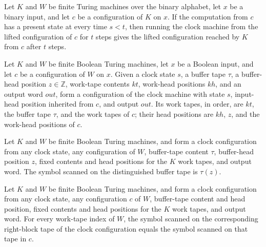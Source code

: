 \begin{lemma}
\label{Complexity.TimeHierarchy.kCfg_run}
\leanok
{}
Let $K$ and $W$ be finite Turing machines over the binary alphabet, let $x$ be a binary
input, and let $c$ be a configuration of $K$ on $x$. If the computation from $c$ has a
present state at every time $s<t$, then running the clock machine from the lifted
configuration of $c$ for $t$ steps gives the lifted configuration reached by $K$ from
$c$ after $t$ steps.
\end{lemma}

\begin{definition}
\label{Complexity.TimeHierarchy.ctrCfg}
\leanok
{}
Let $K$ and $W$ be finite Boolean Turing machines, let $x$ be a Boolean input, and let
$c$ be a configuration of $W$ on $x$. Given a clock state $s$, a buffer tape $\tau$, a
buffer-head position $z\in\mathbb Z$, work-tape contents $kt$, work-head positions $kh$,
and an output word $out$, form a configuration of the clock machine with state $s$,
input-head position inherited from $c$, and output $out$. Its work tapes, in order, are
$kt$, the buffer tape $\tau$, and the work tapes of $c$; their head positions are $kh$,
$z$, and the work-head positions of $c$.
\end{definition}

\begin{lemma}
\label{Complexity.TimeHierarchy.ctrCfg_ctr}
\leanok
{}
Let $K$ and $W$ be finite Boolean Turing machines, and form a clock configuration from
any clock state, any configuration of $W$, buffer-tape content $\tau$, buffer-head
position $z$, fixed contents and head positions for the $K$ work tapes, and output word.
The symbol scanned on the distinguished buffer tape is $\tau(z)$.
\end{lemma}

\begin{lemma}
\label{Complexity.TimeHierarchy.ctrCfg_right}
\leanok
{}
Let $K$ and $W$ be finite Boolean Turing machines, and form a clock configuration from
any clock state, any configuration $c$ of $W$, buffer-tape content and head position,
fixed contents and head positions for the $K$ work tapes, and output word. For every
work-tape index of $W$, the symbol scanned on the corresponding right-block tape of the
clock configuration equals the symbol scanned on that tape in $c$.
\end{lemma}

